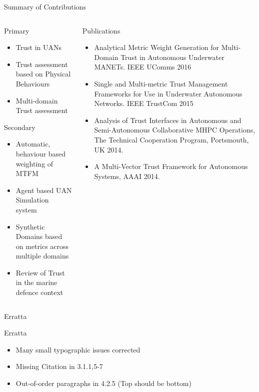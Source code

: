 \documentclass[aspectratio=169]{beamer}
\begin{document}
\begin{frame}{Summary of Contributions}
	\begin{columns}
		\begin{column}{0.45\textwidth}
			\begin{exampleblock}{Primary}
				\begin{itemize}
					\item Trust in UANs
					\item Trust assessment based on Physical Behaviours
					\item Multi-domain Trust assessment 
				\end{itemize}
			\end{exampleblock}
			\begin{block}{Secondary}
				\begin{itemize}
					\item Automatic, behaviour based weighting of MTFM
					\item Agent based UAN Simulation system
					\item Synthetic Domains based on metrics across multiple domains
					\item Review of Trust in the marine defence context
				\end{itemize}
			\end{block}
		\end{column}
		\begin{column}{0.55\textwidth}
			\begin{block}{Publications}
				\begin{itemize}  
					\item Analytical Metric Weight Generation for Multi-Domain Trust in Autonomous Underwater MANETs. IEEE UComms 2016
					\item Single and Multi-metric Trust Management Frameworks for Use in Underwater Autonomous Networks. IEEE TrustCom 2015
					\item Analysis of Trust Interfaces in Autonomous and Semi-Autonomous Collaborative MHPC Operations, The Technical Cooperation Program, Portsmouth, UK 2014.
					\item A Multi-Vector Trust Framework for Autonomous Systems, AAAI 2014.
				\end{itemize}  
			\end{block}
		\end{column}
	\end{columns}
\end{frame}

\begin{frame}{Erratta}
	\begin{alertblock}{Erratta}
		\begin{itemize}
			\item Many small typographic issues corrected
			\item Missing Citation in 3.1.1,5-7 
			\item Out-of-order paragraphs in 4.2.5 (Top should be bottom)
		\end{itemize}
	\end{alertblock}
	
\end{frame}
\end{document}
